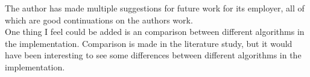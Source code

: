 \documentclass{article}
\begin{document}


The author has made multiple suggestions for future work for its employer, all of which are good continuations on the authors work.\\










One thing I feel could be added is an comparison between different algorithms in the implementation. Comparison is made in the literature study, but it would have been interesting to see some differences between different algorithms in the implementation.








\end{document}
